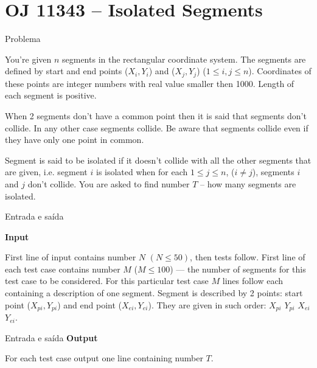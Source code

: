\section{OJ 11343 -- Isolated Segments}

\begin{frame}[fragile]{Problema}

You’re given $n$ segments in the rectangular coordinate system. The segments are defined by start 
and end points ($X_i , Y_i$) and ($X_j , Y_j$) ($1 \leq i, j \leq n$). Coordinates of these points 
are integer numbers with real value smaller then 1000. Length of each segment is positive.

When 2 segments don’t have a common point then it is said that segments don’t collide. In any
other case segments collide. Be aware that segments collide even if they have only one point in 
common.

Segment is said to be isolated if it doesn’t collide with all the other segments that are given, 
i.e.  segment $i$ is isolated when for each $1 \leq j \leq n$, ($ i\neq j$), segments $i$ and $j$ 
don’t collide. You are asked to find number $T$ -- how many segments are isolated.

\end{frame}

\begin{frame}[fragile]{Entrada e saída}

\textbf{Input}

First line of input contains number $N$ $(N \leq 50)$, then tests follow. First line of each test 
case contains number $M$ ($M \leq 100$) — the number of segments for this test case to be 
considered. For this particular test case $M$ lines follow each containing a description of one 
segment. Segment is described by 2 points: start point ($X_{pi}, Y_{pi}$) and end point 
($X_{ei}, Y_{ei}$). They are given in such order: $X_{pi}$ $Y_{pi}$ $X_{ei}$ $Y_{ei}$.
\end{frame}

\begin{frame}[fragile]{Entrada e saída}
\textbf{Output}

For each test case output one line containing number $T$.
\end{frame}

